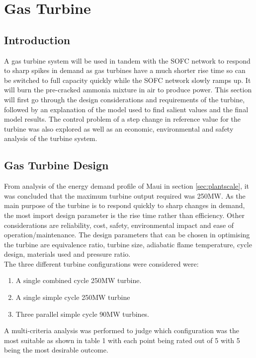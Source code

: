 



%
\section{Gas Turbine}

\subsection{Introduction}\label{sec:intro}
A gas turbine system will be used in tandem with the SOFC network to respond to sharp spikes in demand as gas turbines have a much shorter rise time so can be switched to full capacity quickly while the SOFC network slowly ramps up. It will burn the pre-cracked ammonia mixture in air to produce power. This section will first go through the design considerations and requirements of the turbine, followed by an explanation of the model used to find salient values and the final model results. The control problem of a step change in reference value for the turbine was also explored as well as an economic, environmental and safety analysis of the turbine system.

\subsection{Gas Turbine Design}
From analysis of the energy demand profile of Maui in section \ref{sec:plantscale}, it was concluded that the maximum turbine output required was 250MW. As the main purpose of the turbine is to respond quickly to sharp changes in demand, the most import design parameter is the rise time rather than efficiency. Other considerations are reliability, cost, safety, environmental impact and ease of operation/maintenance. The design parameters that can be chosen in optimising the turbine are equivalence ratio, turbine size, adiabatic flame temperature, cycle design, materials used and pressure ratio.\\The three different turbine configurations were considered were: %
\begin {enumerate}
\item A single combined cycle 250MW turbine.
\item A single simple cycle 250MW turbine 
\item Three parallel simple cycle 90MW turbines. 
\end {enumerate}
A multi-criteria analysis was performed to judge which configuration was the most suitable as shown in table 1 with each point being rated out of 5 with 5 being the most desirable outcome. 

